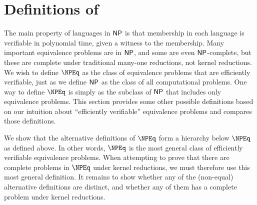 \section{Definitions of \texorpdfstring{\NPEq}{NPEq}}
\label{sec:definitions}
%
The main property of languages in ${\mathsf{NP}}$ is that membership in each language is verifiable in polynomial time, given a witness to the membership.
Many important equivalence problems are in ${\mathsf{NP}}$, and some are even ${\mathsf{NP}}$-complete, but these are complete under traditional many-one reductions, not kernel reductions.
We wish to define $\NPEq$ as the class of equivalence problems that are efficiently verifiable, just as we define ${\mathsf{NP}}$ as the class of all computational problems.
One way to define $\NPEq$ is simply as the subclass of ${\mathsf{NP}}$ that includes only equivalence problems.
This section provides some other possible definitions based on our intuition about ``efficiently verifiable'' equivalence problems and compares those definitions.

%
We show that the alternative definitions of $\NPEq$ form a hierarchy below $\NPEq$ as defined above.
In other words, $\NPEq$ is the most general class of efficiently verifiable equivalence problems.
When attempting to prove that there are complete problems in $\NPEq$ under kernel reductions, we must therefore use this most general definition.
It remains to show whether any of the (non-equal) alternative definitions are distinct, and whether any of them has a complete problem under kernel reductions.

